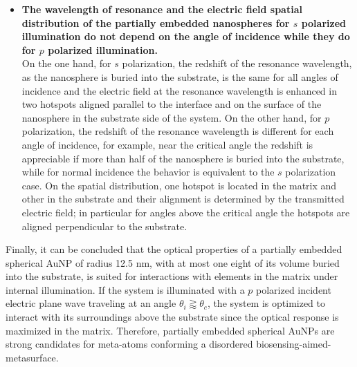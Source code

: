\begin{itemize}
        \item \textbf{The wavelength of resonance and the electric field spatial distribution of the partially embedded nanospheres for $s$ polarized illumination do not depend on the angle of incidence while they do for $p$ polarized illumination.}\\
        On the one hand, for $s$ polarization, the redshift of the resonance wavelength, as the nanosphere is buried into the substrate, is  the same for all angles of incidence and the  electric field at the resonance wavelength is enhanced in two hotspots aligned parallel to the interface and on the surface of the nanosphere in the substrate side of the system. On the other hand, for $p$ polarization, the redshift of the resonance wavelength is different for each angle of incidence, for example, near the critical angle the redshift is appreciable if more than half of the nanosphere is buried into the substrate, while for normal incidence the behavior is equivalent to the $s$ polarization case. On the spatial distribution, one hotspot is located in the matrix and other in the substrate and their alignment is determined by the transmitted electric field; in particular for angles above the critical angle the hotspots are aligned perpendicular to the substrate.
    \end{itemize}

Finally, it can be concluded that the optical properties of a partially embedded spherical AuNP of radius 12.5 nm, with at most one eight of its volume buried into the substrate, is suited for interactions with elements in the matrix under internal illumination. If the system is illuminated with a $p$ polarized incident electric plane wave traveling at an angle  $\theta_i \gtrapprox \theta_c$, the system is optimized to interact with its surroundings above the substrate since the optical response is maximized in the matrix. Therefore, partially embedded spherical AuNPs are strong candidates for meta-atoms conforming a disordered biosensing-aimed-metasurface.


